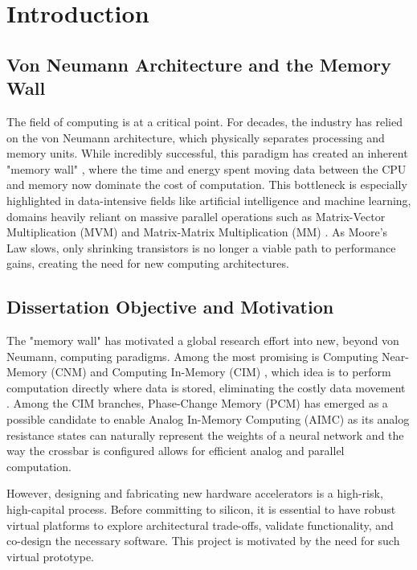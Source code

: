 \chapter{Introduction}\label{chap:intro}
\section{Von Neumann Architecture and the Memory Wall}\label{sec:memwall}
The field of computing is at a critical point. For decades, the industry has relied on the von Neumann architecture, 
which physically separates processing and memory units. 
While incredibly successful, this paradigm has created an inherent "memory wall" \cite{gholami_ai_2024}, where the time and energy spent moving 
data between the CPU and memory now dominate the cost of computation. 
This bottleneck is especially highlighted in data-intensive fields like artificial intelligence and machine learning, 
domains heavily reliant on massive parallel operations such as Matrix-Vector Multiplication (MVM) and Matrix-Matrix Multiplication (MM) \cite{gholami_ai_2024,khan_landscape_2024}. 
As Moore's Law slows, only shrinking transistors is no longer a viable path to performance gains, creating the need for new computing architectures.

\section{Dissertation Objective and Motivation}\label{sec:obj}

The "memory wall" has motivated a global research effort into new, beyond von Neumann, computing paradigms. 
Among the most promising is Computing Near-Memory (CNM) and Computing In-Memory (CIM) , which idea is to perform computation directly where data is stored, eliminating the costly data movement \cite{khan_landscape_2024}.
Among the CIM branches, Phase-Change Memory (PCM) has emerged as a possible candidate to enable Analog In-Memory Computing (AIMC) as its analog resistance states can naturally 
represent the weights of a neural network and the way the crossbar is configured allows for efficient analog and parallel computation.

However, designing and fabricating new hardware accelerators is a high-risk, high-capital process. 
Before committing to silicon, it is essential to have robust virtual platforms to explore architectural trade-offs, 
validate functionality, and co-design the necessary software. This project is motivated by the need for such virtual prototype.

